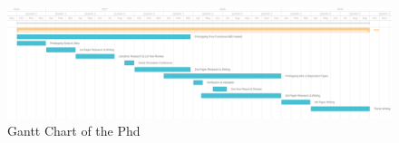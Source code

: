 \begin{landscape}
	\label{fig:gantt}
	\centering
	
	\begin{figure}
	\centering
	\includegraphics[width=1.5\textwidth, height=1\textwidth, angle=0]{./fig/phd_gantt.png}
	\caption{Gantt Chart of the Phd}
	\label{fig:gantt}
\end{figure}
\end{landscape}